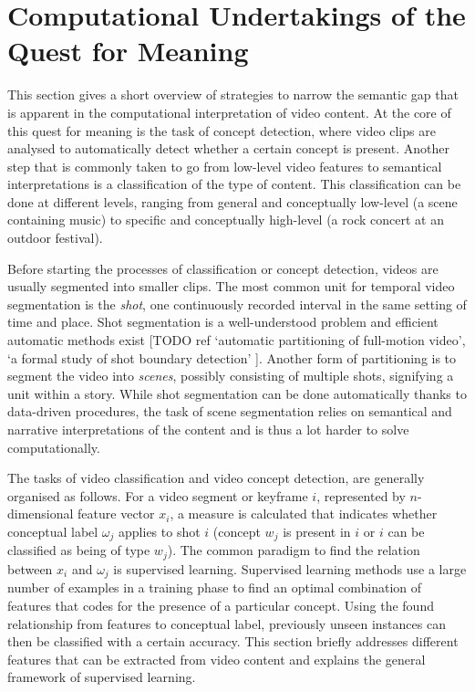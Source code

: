 
\section{Computational Undertakings of the Quest for Meaning}

This section gives a short overview of strategies to narrow the semantic gap that is apparent in the computational interpretation of video content. At the core of this quest for meaning is the task of concept detection\cite{Snoek:2009dq}, where video clips are analysed to automatically detect whether a certain concept is present. Another step that is commonly taken to go from low-level video features to semantical interpretations is a classification of the type of content. This classification can be done at different levels, ranging from general and conceptually low-level (a scene containing music) to specific and conceptually high-level (a rock concert at an outdoor festival)\cite{Wang:2000vf}.

Before starting the processes of classification or concept detection, videos are usually segmented into smaller clips. The most common unit for temporal video segmentation is the \emph{shot}, one continuously recorded interval in the same setting of time and place. Shot segmentation is a well-understood problem and efficient automatic methods exist [TODO ref `automatic partitioning of full-motion video', `a formal study of shot boundary detection' ]. Another form of partitioning is to segment the video into \emph{scenes}, possibly consisting of multiple shots, signifying a unit within a story\cite{Wang:2000vf}. While shot segmentation can be done automatically thanks to data-driven procedures, the task of scene segmentation relies on semantical and narrative interpretations of the content and is thus a lot harder to solve computationally.

The tasks of video classification and video concept detection, are generally organised as follows. For a video segment or keyframe $i$, represented by $n$-dimensional feature vector $x_i$, a measure is calculated that indicates whether conceptual label $\omega_j$ applies to shot $i$ (concept $w_j$ is present in $i$ or  $i$ can be classified as being of type $w_j$). The common paradigm to find the relation between $x_i$ and $\omega_j$ is supervised learning. Supervised learning methods use a large number of examples in a training phase to find an optimal combination of features that codes for the presence of a particular concept. Using the found relationship from features to conceptual label, previously unseen instances can then be classified with a certain accuracy. This section briefly addresses different features that can be extracted from video content and explains the general framework of supervised learning.

